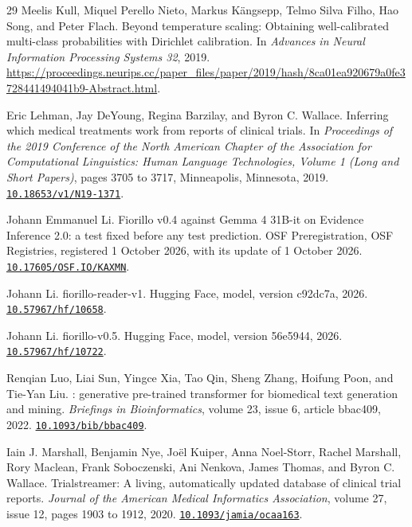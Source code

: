 \documentclass[11pt,letterpaper]{article}
\newcommand{\doi}[1]{\href{https://doi.org/#1}{\nolinkurl{#1}}}
\begin{document}
\begin{thebibliography}{29}
Meelis Kull, Miquel Perello Nieto, Markus K{\"a}ngsepp, Telmo Silva Filho, Hao Song, and Peter Flach.
\newblock Beyond temperature scaling: Obtaining well-calibrated multi-class probabilities with {Dirichlet} calibration.
\newblock In \emph{Advances in Neural Information Processing Systems 32}, 2019.
\newblock \url{https://proceedings.neurips.cc/paper_files/paper/2019/hash/8ca01ea920679a0fe3728441494041b9-Abstract.html}.

Eric Lehman, Jay DeYoung, Regina Barzilay, and Byron C. Wallace.
\newblock Inferring which medical treatments work from reports of clinical trials.
\newblock In \emph{Proceedings of the 2019 Conference of the North American Chapter of the Association for Computational Linguistics: Human Language Technologies, Volume 1 (Long and Short Papers)}, pages 3705 to 3717, Minneapolis, Minnesota, 2019.
\newblock \doi{10.18653/v1/N19-1371}.

Johann Emmanuel Li.
\newblock Fiorillo v0.4 against Gemma 4 31B-it on Evidence Inference 2.0: a test fixed before any test prediction.
\newblock OSF Preregistration, OSF Registries, registered 1 October 2026, with its update of 1 October 2026.
\newblock \doi{10.17605/OSF.IO/KAXMN}.

Johann Li.
\newblock fiorillo-reader-v1.
\newblock Hugging Face, model, version c92dc7a, 2026.
\newblock \doi{10.57967/hf/10658}.

Johann Li.
\newblock fiorillo-v0.5.
\newblock Hugging Face, model, version 56e5944, 2026.
\newblock \doi{10.57967/hf/10722}.

Renqian Luo, Liai Sun, Yingce Xia, Tao Qin, Sheng Zhang, Hoifung Poon, and Tie-Yan Liu.
: generative pre-trained transformer for biomedical text generation and mining.
\newblock \emph{Briefings in Bioinformatics}, volume 23, issue 6, article bbac409, 2022.
\newblock \doi{10.1093/bib/bbac409}.

Iain J. Marshall, Benjamin Nye, Jo{\"e}l Kuiper, Anna Noel-Storr, Rachel Marshall, Rory Maclean, Frank Soboczenski, Ani Nenkova, James Thomas, and Byron C. Wallace.
\newblock Trialstreamer: A living, automatically updated database of clinical trial reports.
\newblock \emph{Journal of the American Medical Informatics Association}, volume 27, issue 12, pages 1903 to 1912, 2020.
\newblock \doi{10.1093/jamia/ocaa163}.


\end{thebibliography}
\end{document}
